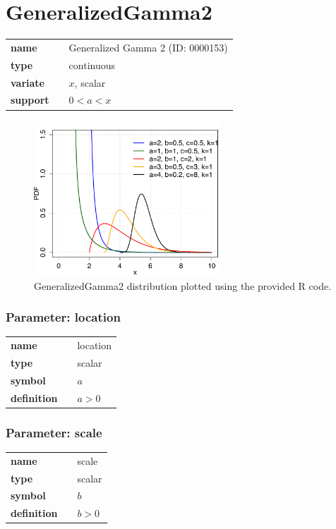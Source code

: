 \section*{GeneralizedGamma2} 

  \bigskip 

\begin{tabular}{p{2cm}cl}
\textbf{name} & & Generalized Gamma 2 (ID: 0000153)\\ 
 
\textbf{type} & & continuous \\ 

\textbf{variate} & & $x$, scalar \\ 

\textbf{support} & & $0 < a < x$
\end{tabular}

\begin{figure}[ht!]
\centering
  \includegraphics[width=70mm]{pics/GeneralizedGamma2.pdf}
 \caption{GeneralizedGamma2 distribution plotted using the provided R code.}
 \label{fig:GeneralizedGamma2}
\end{figure}

\subsubsection*{Parameter: location}

\noindent\begin{tabular}{p{2cm}cl}
\textbf{name} & & location \\
\textbf{type} & & scalar \\
\textbf{symbol} & & $a$  \\
\textbf{definition} & & $a > 0$
\end{tabular}
\subsubsection*{Parameter: scale}

\noindent\begin{tabular}{p{2cm}cl}
\textbf{name} & & scale \\
\textbf{type} & & scalar \\
\textbf{symbol} & & $b$  \\
\textbf{definition} & & $b > 0$
\end{tabular}
